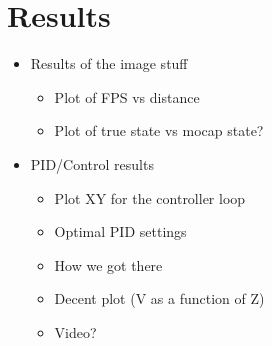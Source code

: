 \documentclass[11pt, twocolumn]{article}
\begin{document}
\section{Results}
\begin{itemize}
	\item Results of the image stuff
	\begin{itemize}
		\item Plot of FPS vs distance
		\item Plot of true state vs mocap state?
	\end{itemize}
	
	\item PID/Control results 
	\begin{itemize}
		\item Plot XY for the controller loop
		\item Optimal PID settings
		\item How we got there
		\item Decent plot (V as a function of Z)
		\item Video?
	\end{itemize}
	
\end{itemize}
\end{document}
